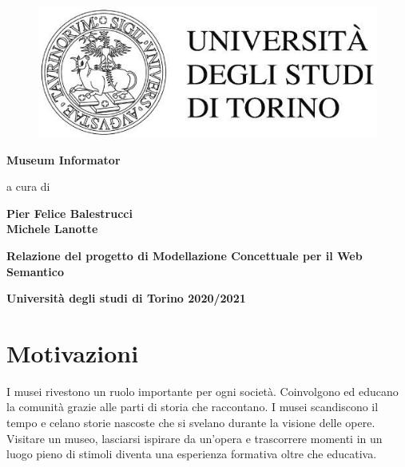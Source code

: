 \documentclass[12pt]{article}
\begin{document}
\begin{figure}[h!]
\vskip1in
\begin{center}
\includegraphics[scale = 2]{fig/logo.jpg}
\end{center}
\end{figure}

\begin{center}
\large{\textbf{Museum Informator}}
\end{center}

\vskip2.5cm

\begin{center}
a cura di
\end{center}

\vskip0.6cm

\begin{center}
\textbf{Pier Felice Balestrucci}\\
\textbf{Michele Lanotte}\\
\end{center}

\vskip3.5cm
 
\begin{center}
\textbf{Relazione del progetto di Modellazione Concettuale per il Web Semantico}
\end{center}

\begin{center}
\textbf{Università degli studi di Torino 2020/2021}
\end{center}
\newpage
\begin{center}
\tableofcontents
\end{center}
\pagebreak
\section{Motivazioni}
I musei rivestono un ruolo importante per ogni società. Coinvolgono ed educano la comunità grazie alle parti di storia che raccontano. I musei scandiscono il tempo e celano storie nascoste che si svelano durante la visione delle opere.  
Visitare un museo, lasciarsi ispirare da un’opera e trascorrere momenti in un luogo pieno di stimoli diventa una esperienza formativa oltre che educativa.
\end{document}
